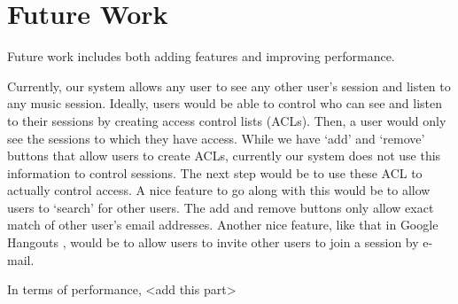 \section{Future Work}
\label{sec:futurework}
Future work includes both adding features and improving performance.

Currently, our system allows any user to see any other user's session 
and listen to any music session. Ideally, users would be able to control 
who can see and listen to their sessions by creating 
access control lists (ACLs). Then, a user would only see 
the sessions to which they have access. While we have `add' and `remove' 
buttons that allow users to create ACLs, currently our system does not 
use this information to control sessions. The next step would be to 
use these ACL to actually control access. A nice feature to go along with this 
would be to allow users to `search' for other users. The add and remove 
buttons only allow exact match of other user's email addresses. Another nice feature, 
like that in Google Hangouts \cite{googlehangouts}, would be to allow users to 
invite other users to join a session by e-mail. 

In terms of performance, <add this part>

